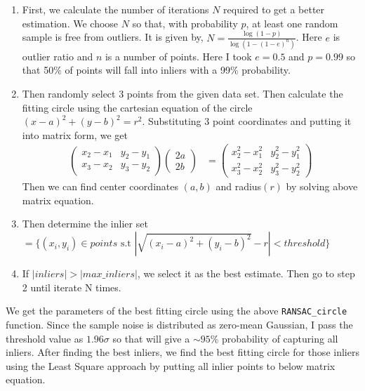 \documentclass[a4paper]{article}
\begin{document}
\begin{enumerate}
  \itemsep0em 
  \item First, we calculate the number of iterations $N$ required to get a better estimation. We choose $N$ 
  so that, with probability $p$, at least one random sample is free from outliers.
  It is given by, $N=\frac{\log{(1-p)}}{\log{(1-(1-e)^n)}}$. Here $e$ is outlier
  ratio and $n$ is a number of points. Here I took $e=0.5$ and $p=0.99$ so 
  that 50\% of points will fall into inliers with a 99\% probability.
  \item Then randomly select 3 points from the given data set. Then calculate the fitting
   circle using the cartesian equation of the circle $(x-a)^2+(y-b)^2=r^2$. Substituting
    3 point coordinates and putting it into matrix form, we get
   \begin{align*}
     \begin{pmatrix}
       x_2-x_1 & y_2-y_1\\
       x_3-x_2 & y_3-y_2
     \end{pmatrix}
     \begin{pmatrix}
       2a\\
       2b
     \end{pmatrix}&=
     \begin{pmatrix}
      x_2^2-x_1^2 & y_2^2-y_1^2\\
      x_3^2-x_2^2 & y_3^2-y_2^2
    \end{pmatrix}
   \end{align*}
   Then we can find center coordinates $(a, b)$ and radius$(r)$ by solving above matrix equation.
   \item Then determine the inlier set 
   $=\{(x_i,y_i)\in points \text{ s.t }|\sqrt{(x_i-a)^2+(y_i-b)^2}-r|<threshold\}$
   \item If $|inliers|>|max\_inliers|$, we select it as the best estimate. Then go to step 2
   until iterate N times.
  \end{enumerate}
We get the parameters of the best fitting circle using the above 
\verb |RANSAC_circle| function. Since the sample noise is distributed as zero-mean
 Gaussian, I pass the threshold value as $1.96\sigma$ so that will give
  a $\sim 95\%$ probability of capturing all inliers. After
   finding the best inliers, we find the best fitting circle for
    those inliers using the Least Square approach by putting all inlier points to below matrix equation.
\end{document}
